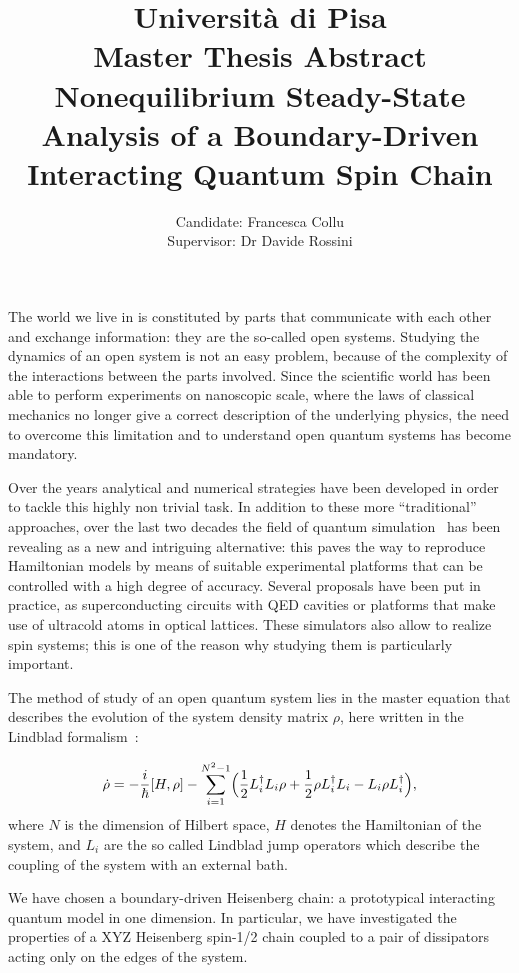 \documentclass[12pt]{extarticle}
\title{{\normalsize{Università di Pisa}}\\{\normalsize{Master Thesis Abstract}}\\[1cm]\textbf{Nonequilibrium Steady-State Analysis of a Boundary-Driven Interacting Quantum Spin Chain}}
\author{Candidate: Francesca Collu\\{Supervisor: Dr Davide Rossini}}
\date{}
\begin{document}
\maketitle

The world we live in is constituted by parts that communicate with each other and exchange information: they are the so-called open systems. Studying the dynamics of an open system is not an easy problem, because of the complexity of the interactions between the parts involved. Since the scientific world has been able to perform experiments on nanoscopic scale, where the laws of classical mechanics no longer give a correct description of the underlying physics, the need to overcome this limitation and to understand open quantum systems has become mandatory.

Over the years analytical and numerical strategies have been developed in order to tackle this highly non trivial task. In addition to these more ``traditional'' approaches, over the last two decades the field of quantum simulation~\cite{special_issue_nature} has been revealing as a new and intriguing alternative: this paves the way to reproduce Hamiltonian models by means of suitable experimental platforms that can be controlled with a high degree of accuracy. Several proposals have been put in practice, as superconducting circuits with QED cavities or platforms that make use of ultracold atoms in optical lattices. These simulators also allow to realize spin systems; this is one of the reason why studying them is particularly important.

The method of study of an open quantum system lies in the master equation that describes the evolution of the system density matrix $\rho$, here written in the Lindblad formalism~\cite{pet_breuer:open_quantum}:

\begin{equation*}
    \dot{\rho} = -\frac{i}{\hbar}[H, \rho] - \sum_{i=1}^{N^2-1} \Bigl(\frac{1}{2}L_i^{\dagger}L_i\rho + \frac{1}{2}\rho L_i^{\dagger}L_i - L_i\rho L_i^{\dagger}\Bigl),
\end{equation*}
where $N$ is the dimension of Hilbert space, $H$ denotes the Hamiltonian of the system, and $L_i$ are the so called Lindblad jump operators which describe the coupling of the system with an external bath.

We have chosen a boundary-driven Heisenberg chain: a prototypical interacting quantum model in one dimension. In particular, we have investigated the properties of a XYZ Heisenberg spin-1/2 chain coupled to a pair of dissipators acting only on the edges of the system. 
\end{document}
